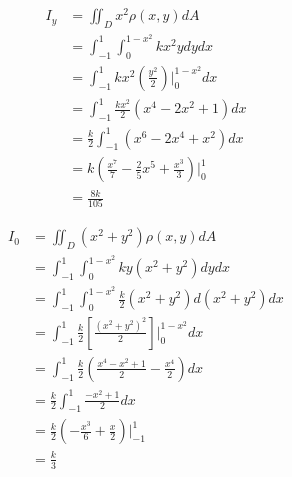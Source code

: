 \documentclass{article}
\begin{document}
   $$\begin{aligned}
     I_y &= \iint_D x^2 \rho(x, y) dA \\
     &= \int_{-1}^1 \int_0^{1-x^2} kx^2y dy dx \\
     &= \int_{-1}^1 kx^2(\frac{y^2}{2})\biggl|_0^{1-x^2}dx \\
     &= \int_{-1}^1 \frac{kx^2}{2}(x^4-2x^2+1) dx \\
     &= \frac{k}{2} \int_{-1}^1 (x^6 - 2x^4 + x^2)dx \\
     &= k (\frac{x^7}{7} - \frac{2}{5}x^5 + \frac{x^3}{3})\biggl|_0^1 \\
     &= \frac{8k}{105}
   \end{aligned}$$

   $$\begin{aligned}
     I_0 &= \iint_D (x^2+y^2) \rho(x, y) dA \\
     &= \int_{-1}^1 \int_0^{1-x^2} ky(x^2+y^2) dy dx \\
     &= \int_{-1}^1 \int_0^{1-x^2} \frac k 2 (x^2+y^2)d(x^2+y^2) dx \\
     &= \int_{-1}^1 \frac k 2 [\frac{(x^2+y^2)^2}{2}]\biggl|_0^{1-x^2} dx \\
     &= \int_{-1}^1 \frac k 2 (\frac{x^4-x^2+1}{2} - \frac{x^4}{2}) dx \\
     &= \frac k 2 \int_{-1}^1 \frac{-x^2 + 1}{2} dx \\
     &= \frac k 2 (-\frac{x^3}{6} + \frac{x}{2})\biggl|_{-1}^1 \\
     &= \frac k 3
   \end{aligned}$$
\end{document}
